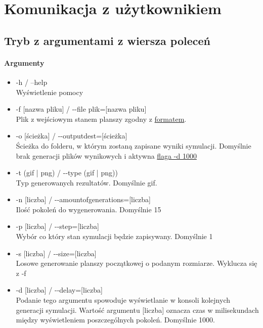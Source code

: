 \documentclass{report}
\begin{document}
\section{Komunikacja z użytkownikiem}

\subsection{Tryb z argumentami z wiersza poleceń}
\paragraph{Argumenty}
\begin{itemize}
\item -h / --help \\ Wyświetlenie pomocy
\item -f [nazwa pliku]  / -{}-file plik=[nazwa pliku] \\ Plik z wejściowym stanem planszy zgodny z \hyperref[format]{\textcolor{LinkColor}{formatem}}. %
\item -o [ścieżka] / -{}-output\textunderscore{}dest=[ścieżka]  \\Ścieżka do folderu, w którym zostaną zapisane wyniki \label{output_dest} symulacji. Domyślnie brak generacji plików wynikowych i aktywna \hyperref[delay]{\textcolor{LinkColor}{flaga -d 1000}}
\item -t (gif | png) / -{}-type (gif | png)) \\Typ generowanych rezultatów. Domyślnie gif. \label{output_args}
\item -n [liczba] / -{}-amount\textunderscore{}of\textunderscore{}generations=[liczba] \\ Ilość pokoleń do wygenerowania. Domyślnie 15
\item -p [liczba] / -{}-step=[liczba] \\ Wybór co który stan symulacji będzie zapisywany. Domyślnie 1
\item -s [liczba] / -{}-size=[liczba] \\ Losowe generowanie planszy początkowej o podanym rozmiarze. Wyklucza się z -f
\item \label{delay} -d [liczba] / -{}-delay=[liczba] \\ Podanie tego argumentu spowoduje wyświetlanie w konsoli kolejnych generacji symulacji. Wartość argumentu [liczba] oznacza czas  w milisekundach między wyświetleniem poszczególnych pokoleń. Domyślnie 1000.
\end{itemize}
\end{document}
